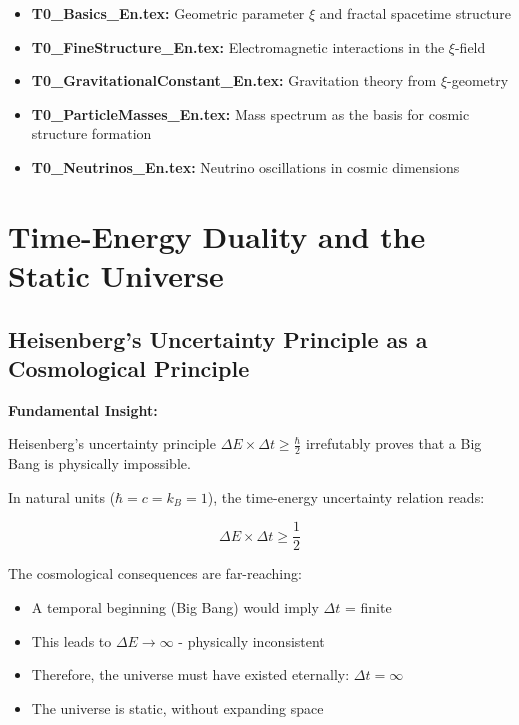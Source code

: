 \documentclass[12pt,a4paper]{article}
\newcommand{\xipar}{\xi}
\begin{document}
	\begin{itemize}
		\item \textbf{T0\_Basics\_En.tex:} Geometric parameter $\xipar$ and fractal spacetime structure
		\item \textbf{T0\_FineStructure\_En.tex:} Electromagnetic interactions in the $\xi$-field
		\item \textbf{T0\_GravitationalConstant\_En.tex:} Gravitation theory from $\xi$-geometry
		\item \textbf{T0\_ParticleMasses\_En.tex:} Mass spectrum as the basis for cosmic structure formation
		\item \textbf{T0\_Neutrinos\_En.tex:} Neutrino oscillations in cosmic dimensions
	\end{itemize}
	
	\section{Time-Energy Duality and the Static Universe}
	
	\subsection{Heisenberg's Uncertainty Principle as a Cosmological Principle}
	
	\begin{revolutionary}
		\textbf{Fundamental Insight:}
		
		Heisenberg's uncertainty principle $\Delta E \times \Delta t \geq \frac{\hbar}{2}$ irrefutably proves that a Big Bang is physically impossible.
	\end{revolutionary}
	
	In natural units ($\hbar = c = k_B = 1$), the time-energy uncertainty relation reads:
	
	\begin{equation}
		\Delta E \times \Delta t \geq \frac{1}{2}
	\end{equation}
	
	The cosmological consequences are far-reaching:
	
	\begin{itemize}
		\item A temporal beginning (Big Bang) would imply $\Delta t$ = finite
		\item This leads to $\Delta E \to \infty$ - physically inconsistent
		\item Therefore, the universe must have existed eternally: $\Delta t = \infty$
		\item The universe is static, without expanding space
	\end{itemize}
	
\end{document}
